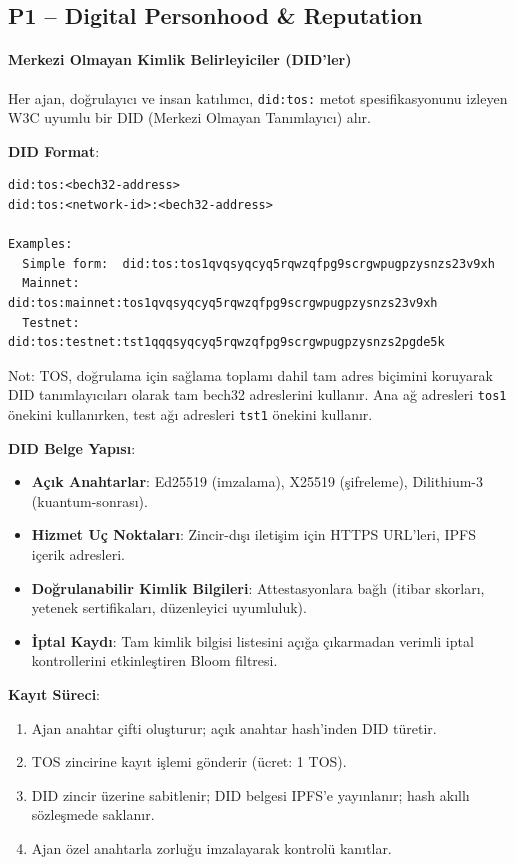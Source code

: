 \documentclass[11pt]{article}
\begin{document}
\subsection{P1 -- Digital Personhood \& Reputation}
\label{sec:pillar-identity}

\paragraph{Merkezi Olmayan Kimlik Belirleyiciler (DID'ler)}
Her ajan, doğrulayıcı ve insan katılımcı, \texttt{did:tos:} metot spesifikasyonunu izleyen W3C uyumlu bir DID (Merkezi Olmayan Tanımlayıcı) alır.

\textbf{DID Format}:
\begin{verbatim}
did:tos:<bech32-address>
did:tos:<network-id>:<bech32-address>

Examples:
  Simple form:  did:tos:tos1qvqsyqcyq5rqwzqfpg9scrgwpugpzysnzs23v9xh
  Mainnet:      did:tos:mainnet:tos1qvqsyqcyq5rqwzqfpg9scrgwpugpzysnzs23v9xh
  Testnet:      did:tos:testnet:tst1qqqsyqcyq5rqwzqfpg9scrgwpugpzysnzs2pgde5k
\end{verbatim}
Not: TOS, doğrulama için sağlama toplamı dahil tam adres biçimini koruyarak DID tanımlayıcıları olarak tam bech32 adreslerini kullanır. Ana ağ adresleri \texttt{tos1} önekini kullanırken, test ağı adresleri \texttt{tst1} önekini kullanır.

\textbf{DID Belge Yapısı}:
\begin{itemize}[noitemsep]
  \item \textbf{Açık Anahtarlar}: Ed25519 (imzalama), X25519 (şifreleme), Dilithium-3 (kuantum-sonrası).
  \item \textbf{Hizmet Uç Noktaları}: Zincir-dışı iletişim için HTTPS URL'leri, IPFS içerik adresleri.
  \item \textbf{Doğrulanabilir Kimlik Bilgileri}: Attestasyonlara bağlı (itibar skorları, yetenek sertifikaları, düzenleyici uyumluluk).
  \item \textbf{İptal Kaydı}: Tam kimlik bilgisi listesini açığa çıkarmadan verimli iptal kontrollerini etkinleştiren Bloom filtresi.
\end{itemize}

\textbf{Kayıt Süreci}:
\begin{enumerate}[noitemsep]
  \item Ajan anahtar çifti oluşturur; açık anahtar hash'inden DID türetir.
  \item TOS zincirine kayıt işlemi gönderir (ücret: 1 TOS).
  \item DID zincir üzerine sabitlenir; DID belgesi IPFS'e yayınlanır; hash akıllı sözleşmede saklanır.
  \item Ajan özel anahtarla zorluğu imzalayarak kontrolü kanıtlar.
\end{enumerate}
\end{document}
